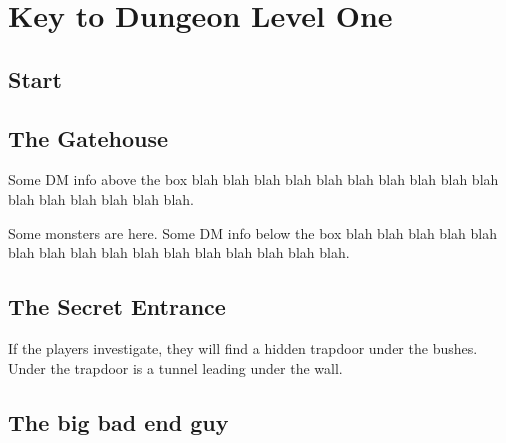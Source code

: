 \documentclass[a4paper,serif]{module}       %
\begin{document}
\section*{Key to Dungeon Level One}

\subsection*{Start}


\subsection{The Gatehouse}

Some DM info above the box blah blah blah blah blah blah blah blah blah blah blah blah blah blah blah blah.


Some monsters are here.
Some DM info below the box blah blah blah blah blah blah blah blah blah blah blah blah blah blah blah blah.

\subsection{The Secret Entrance}


If the players investigate, they will find a hidden trapdoor under the bushes. Under the trapdoor is a tunnel leading under the wall.

\subsection{The big bad end guy}
\end{document}
